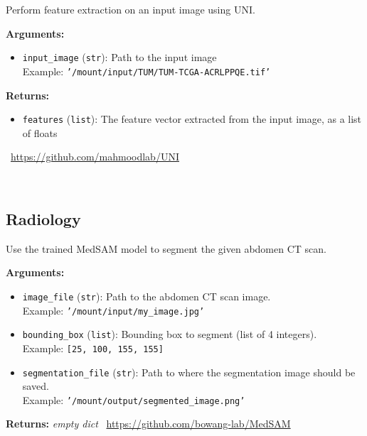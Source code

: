 \begin{tcolorbox}[title={\texttt{uni\_extract\_features}}]
Perform feature extraction on an input image using UNI.

\vspace{.5em}
\textbf{Arguments:}
\begin{itemize}[topsep=0pt,parsep=-1pt,partopsep=0pt]
\item \texttt{input\_image} (\texttt{str}): Path to the input image\\  Example: \texttt{'/mount/input/TUM/TUM-TCGA-ACRLPPQE.tif'}
\end{itemize}

\vspace{.5em}
\textbf{Returns:} \begin{itemize}[topsep=0pt,parsep=-1pt,partopsep=0pt]
\item \texttt{features} (\texttt{list}): The feature vector extracted from the input image, as a list of floats
\end{itemize}
\tcblower
\setlength{\hangindent}{\widthof{\faGithub~}}
\faGithub~\url{https://github.com/mahmoodlab/UNI}

\vspace{.5em}\setlength{\hangindent}{\widthof{\faFile*[regular]~}}\faFile*[regular]~


\end{tcolorbox}

\subsection{Radiology}
\label{app:tasks:radiology}
\begin{tcolorbox}[title={\texttt{medsam\_inference}}]
Use the trained MedSAM model to segment the given abdomen CT scan.

\vspace{.5em}
\textbf{Arguments:}
\begin{itemize}[topsep=0pt,parsep=-1pt,partopsep=0pt]
\item \texttt{image\_file} (\texttt{str}): Path to the abdomen CT scan image.\\  Example: \texttt{'/mount/input/my\_image.jpg'}
\item \texttt{bounding\_box} (\texttt{list}): Bounding box to segment (list of 4 integers).\\  Example: \texttt{[25, 100, 155, 155]}
\item \texttt{segmentation\_file} (\texttt{str}): Path to where the segmentation image should be saved.\\  Example: \texttt{'/mount/output/segmented\_image.png'}
\end{itemize}

\vspace{.5em}
\textbf{Returns:} \textit{empty dict}
\tcblower
\setlength{\hangindent}{\widthof{\faGithub~}}
\faGithub~\url{https://github.com/bowang-lab/MedSAM}

\vspace{.5em}\setlength{\hangindent}{\widthof{\faFile*[regular]~}}\faFile*[regular]~


\end{tcolorbox}

